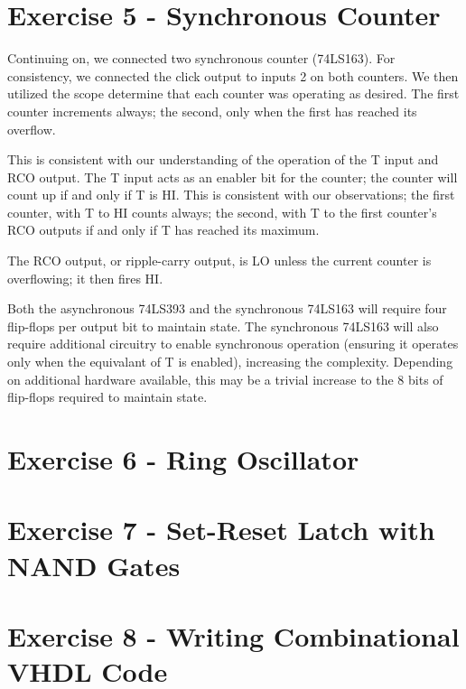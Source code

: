 \documentclass[paper=letter, fontsize=11pt]{scrartcl}
\begin{document}
\section{Exercise 5 - Synchronous Counter}
Continuing on, we connected two synchronous counter (74LS163). For consistency, we connected the click output to inputs 2 on both counters. We then utilized the scope determine that each counter was operating as desired. The first counter increments always; the second, only when the first has reached its overflow.

This is consistent with our understanding of the operation of the T input and RCO output. The T input acts as an enabler bit for the counter; the counter will count up if and only if T is HI. This is consistent with our observations; the first counter, with T to HI counts always; the second, with T to the first counter's RCO outputs if and only if T has reached its maximum.

The RCO output, or ripple-carry output, is LO unless the current counter is overflowing; it then fires HI.

Both the asynchronous 74LS393 and the synchronous 74LS163 will require four flip-flops per output bit to maintain state. The synchronous 74LS163 will also require additional circuitry to enable synchronous operation (ensuring it operates only when the equivalant of T is enabled), increasing the complexity. Depending on additional hardware available, this may be a trivial increase to the 8 bits of flip-flops required to maintain state.

\section{Exercise 6 - Ring Oscillator}

\section{Exercise 7 - Set-Reset Latch with NAND Gates}

\section{Exercise 8 - Writing Combinational VHDL Code}

\end{document}
